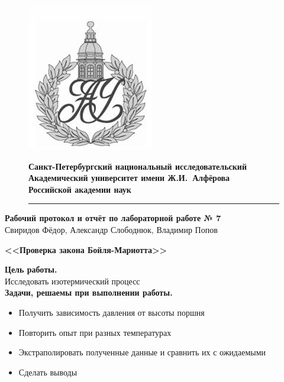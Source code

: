 \documentclass[a4paper]{article}
\begin{document}
	\begin{figure}[htb]
		\begin{minipage}[c]{0.12\textwidth}
			\includegraphics[scale=0.25]{AU}
		\end{minipage}
		\hfill
		\begin{minipage}[t]{0.9\textwidth}
			{\Large\bfseries Санкт-Петербургский национальный исследовательский Академический университет имени Ж.И.~Алфёрова\\Российской академии наук}
		\end{minipage}
		\rule{164mm}{0.3mm}
	\end{figure}
	
	\begin{center}
		{\large\textbf{Рабочий протокол и отчёт по лабораторной работе № 7}}\\
		Свиридов Фёдор, Александр Слободнюк, Владимир Попов
	\end{center}
	\begin{center}
		\Large\bfseries{<<Проверка закона Бойля-Мариотта>>}\\
	\end{center}
	
	{\parindent=0pt\textbf{Цель работы.}}\\
	Исследовать изотермический процесс\\
	
	{\parindent=0pt\textbf{Задачи, решаемы при выполнении работы.}}
	\begin{itemize}
		\item Получить зависимость давления от высоты поршня
		\item Повторить опыт при разных температурах
		\item  Экстраполировать полученные данные и сравнить их с ожидаемыми
		\item Сделать выводы
    \end{itemize}
\end{document}
